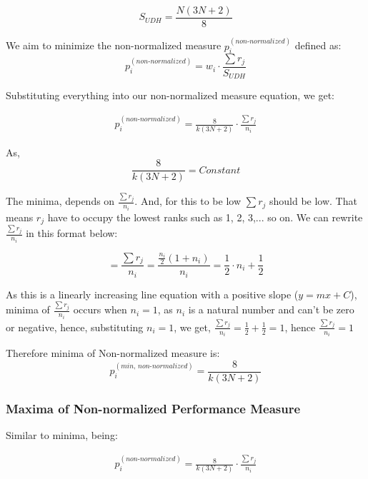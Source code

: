 \documentclass[man,floatsintext]{apa7}
\begin{document}
\begin{equation}
	\label{eq:even-SUDH}
	S_{UDH} = \frac{N(3N + 2)}{8}
\end{equation}


We aim to minimize the non-normalized measure $p_i^{(non\text{-}normalized)}$ defined as:
\begin{equation}
	p_i^{(non\text{-}normalized)} = w_i \cdot \frac{\sum r_j}{ S_{UDH} }
\end{equation}

Substituting everything into our non-normalized measure equation, we get:

\begin{align*}
	p_i^{(non\text{-}normalized)} = \frac{8}{k(3N + 2)}\cdot \frac{\sum r_j}{n_i}
\end{align*}

As, 
\begin{equation}
	\frac{8}{k(3N + 2)} = Constant
\end{equation}

The minima, depends on $\frac{\sum r_j}{n_i}$. And, for this to be low $\sum r_j$ should be low. That means $r_j$ have to occupy the lowest ranks such as 1, 2, 3,... so on. We can rewrite $\frac{\sum r_j}{n_i}$ in this format below:

\begin{equation}
	 = \frac{\sum r_j}{n_i} = \frac{\frac{n_i}{2}(1+n_i)}{n_i} = \frac{1}{2} \cdot n_i + \frac{1}{2}
\end{equation}

As this is a linearly increasing line equation with a positive slope ($y = mx + C$), minima of $\frac{\sum r_j}{n_i}$ occurs when $n_i = 1$, as $n_i$ is a natural number and can't be zero or negative, hence, substituting $n_i = 1$, we get, $\frac{\sum r_j}{n_i} = \frac{1}{2} + \frac{1}{2} = 1$, hence  $\frac{\sum r_j}{n_i} = 1 $

Therefore minima of Non-normalized measure is:
\begin{equation}
	\label{eq:minima}
	p_i^{(min, \, non\text{-}normalized)} = \frac{8}{k(3N + 2)}
\end{equation}

\subsubsection{Maxima of Non-normalized Performance Measure}
Similar to minima, being:

\begin{align*}
	p_i^{(non\text{-}normalized)} = \frac{8}{k(3N + 2)}\cdot \frac{\sum r_j}{n_i}
\end{align*}
\end{document}

